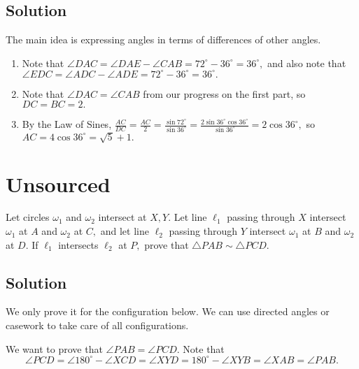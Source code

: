 \documentclass[mast]{lucky}
\begin{document}
\subsection{Solution}

The main idea is expressing angles in terms of differences of other angles.
\begin{enumerate}
\item Note that $\angle DAC=\angle DAE-\angle CAB=72^{\circ}-36^{\circ}=36^{\circ},$ and also note that $\angle EDC=\angle ADC-\angle ADE=72^{\circ}-36^{\circ}=36^{\circ}.$

\item Note that $\angle DAC=\angle CAB$ from our progress on the first part, so $DC=BC=2.$

\item By the Law of Sines, $\frac{AC}{DC}=\frac{AC}{2}=\frac{\sin 72^{\circ}}{\sin 36^{\circ}}=\frac{2\sin 36^{\circ}\cos 36^{\circ}}{\sin 36^{\circ}}=2\cos 36^{\circ},$ so $AC=4\cos 36^{\circ}=\sqrt{5}+1.$
\end{enumerate}

\pagebreak\section{Unsourced}

Let circles $\omega_1$ and $\omega_2$ intersect at $X,Y.$ Let line $\ell_1$ passing through $X$ intersect $\omega_1$ at $A$ and $\omega_2$ at $C,$ and let line $\ell_2$ passing through $Y$ intersect $\omega_1$ at $B$ and $\omega_2$ at $D.$ If $\ell_1$ intersects $\ell_2$ at $P,$ prove that $\triangle PAB\sim \triangle PCD.$

\subsection{Solution}

We only prove it for the configuration below. We can use directed angles or casework to take care of all configurations.

We want to prove that $\angle PAB=\angle PCD.$ Note that
\[\angle PCD=\angle 180^{\circ}-\angle XCD=\angle XYD=180^{\circ}-\angle XYB=\angle XAB=\angle PAB.\]
\end{document}
